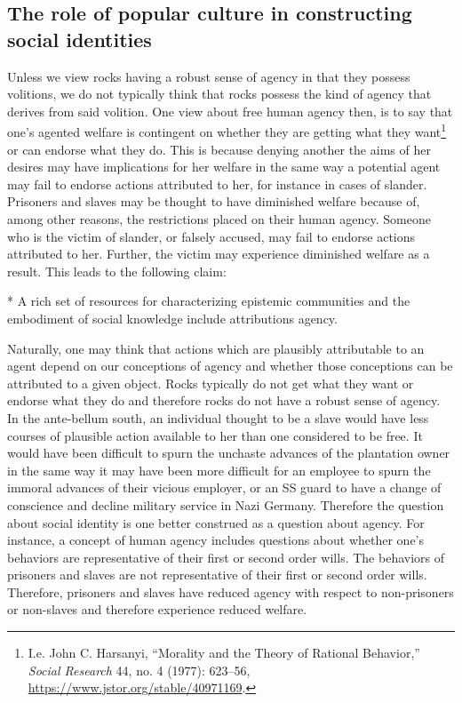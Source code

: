 \documentclass[
  12pt,
]{book}
\newenvironment{Shaded}{\begin{snugshade}}{\end{snugshade}}
\newcommand{\NormalTok}[1]{#1}
\theoremstyle{definition}
\theoremstyle{definition}
\theoremstyle{definition}
\theoremstyle{definition}
\theoremstyle{remark}
\begin{document}
\subsection*{The role of popular culture in constructing social identities}\label{the-role-of-popular-culture-in-constructing-social-identities}

Unless we view rocks having a robust sense of agency in that they possess volitions, we do not typically think that rocks possess the kind of agency that derives from said volition. One view about free human agency then, is to say that one's agented welfare is contingent on whether they are getting what they want\footnote{I.e. John C. Harsanyi, {``Morality and the {Theory} of {Rational Behavior},''} \emph{Social Research} 44, no. 4 (1977): 623--56, \url{https://www.jstor.org/stable/40971169}.} or can endorse what they do. This is because denying another the aims of her desires may have implications for her welfare in the same way a potential agent may fail to endorse actions attributed to her, for instance in cases of slander. Prisoners and slaves may be thought to have diminished welfare because of, among other reasons, the restrictions placed on their human agency. Someone who is the victim of slander, or falsely accused, may fail to endorse actions attributed to her. Further, the victim may experience diminished welfare as a result. This leads to the following claim:

\begin{Shaded}
\begin{Highlighting}[]
\NormalTok{* A rich set of resources for characterizing epistemic communities and the embodiment of social knowledge include attributions agency.}
\end{Highlighting}
\end{Shaded}

Naturally, one may think that actions which are plausibly attributable to an agent depend on our conceptions of agency and whether those conceptions can be attributed to a given object. Rocks typically do not get what they want or endorse what they do and therefore rocks do not have a robust sense of agency. In the ante-bellum south, an individual thought to be a slave would have less courses of plausible action available to her than one considered to be free. It would have been difficult to spurn the unchaste advances of the plantation owner in the same way it may have been more difficult for an employee to spurn the immoral advances of their vicious employer, or an SS guard to have a change of conscience and decline military service in Nazi Germany. Therefore the question about social identity is one better construed as a question about agency. For instance, a concept of human agency includes questions about whether one's behaviors are representative of their first or second order wills. The behaviors of prisoners and slaves are not representative of their first or second order wills. Therefore, prisoners and slaves have reduced agency with respect to non-prisoners or non-slaves and therefore experience reduced welfare.
\end{document}

